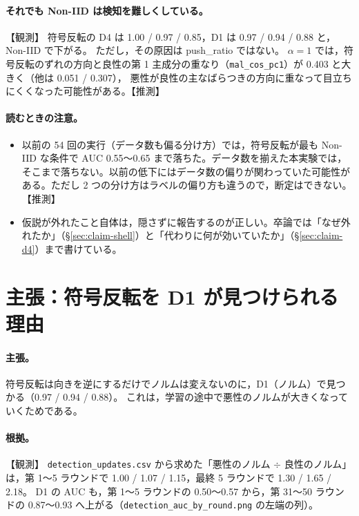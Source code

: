 \documentclass[a4j, dvipdfmx]{jsarticle}  %
\begin{document}
\paragraph{それでも Non-IID は検知を難しくしている。}【観測】
符号反転の D4 は 1.00 / 0.97 / 0.85，D1 は 0.97 / 0.94 / 0.88 と，Non-IID で下がる。
ただし，その原因は push\_ratio ではない。
$\alpha = 1$ では，符号反転のずれの方向と良性の第 1 主成分の重なり（\texttt{mal\_cos\_pc1}）が 0.403 と大きく（他は 0.051 / 0.307），
悪性が良性の主なばらつきの方向に重なって目立ちにくくなった可能性がある。【推測】

\paragraph{読むときの注意。}
\begin{itemize}
  \item 以前の 54 回の実行（データ数も偏る分け方）では，符号反転が最も Non-IID な条件で AUC 0.55〜0.65 まで落ちた。データ数を揃えた本実験では，そこまで落ちない。以前の低下にはデータ数の偏りが関わっていた可能性がある。ただし 2 つの分け方はラベルの偏り方も違うので，断定はできない。【推測】
  \item 仮説が外れたこと自体は，隠さずに報告するのが正しい。卒論では「なぜ外れたか」（\S\ref{sec:claim-shell}）と「代わりに何が効いていたか」（\S\ref{sec:claim-d4}）まで書けている。
\end{itemize}

\section{主張：符号反転を D1 が見つけられる理由}
\label{sec:claim-d1sf}

\paragraph{主張。}
符号反転は向きを逆にするだけでノルムは変えないのに，D1（ノルム）で見つかる（0.97 / 0.94 / 0.88）。
これは，学習の途中で悪性のノルムが大きくなっていくためである。

\paragraph{根拠。}【観測】
\texttt{detection\_updates.csv} から求めた「悪性のノルム $\div$ 良性のノルム」は，第 1〜5 ラウンドで 1.00 / 1.07 / 1.15，最終 5 ラウンドで 1.30 / 1.65 / 2.18。
D1 の AUC も，第 1〜5 ラウンドの 0.50〜0.57 から，第 31〜50 ラウンドの 0.87〜0.93 へ上がる（\texttt{detection\_auc\_by\_round.png} の左端の列）。
\end{document}
